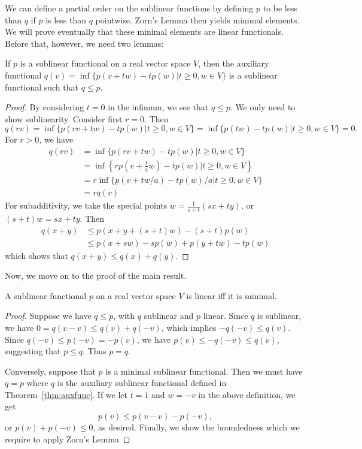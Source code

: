 \documentclass[prb,12pt]{revtex4-2}
\theoremstyle{definition}
\theoremstyle{definition}
\theoremstyle{definition}
\begin{document}
We can define a partial order on the sublinear functions by defining $p$ to be less than $q$ if $p$ is less than $q$ pointwise. Zorn's Lemma then yields minimal elements. We will prove eventually that these minimal elements are linear functionals. Before that, however, we need two lemmas:

\begin{Theorem}\label{thm:auxfunc}
	If $p$ is a sublinear functional on a real vector space $V$, then the auxiliary functional $q(v)=\inf \{p(v+tw)-tp(w)|t\ge 0,w\in V\} $ is a sublinear functional such that $q \le p$.
\end{Theorem}
\begin{proof}
	By considering $t=0$ in the infimum, we see that $q\le p$. We only need to show sublinearity. Consider first $r=0$. Then
	\[
	q(rv)=\inf \{p(rv+tw)-tp(w)|t\ge 0,w\in V\} =\inf \{p(tw)-tp(w)|t\ge 0, w\in V\} =0
	.\] 
	For $r>0$, we have
	\begin{align*}
		q(rv)&=\inf \{p(rv+tw)-tp(w)|t \ge 0, w\in V\} \\
		     &=\inf \left\{ rp\left( v+\frac{t}{a}w \right)-tp(w)|t\ge 0, w\in V \right\} \\
		     &=r\inf \{p(v+tw / a) -tp(w) / a|t\ge 0, w\in V\} \\
		     &=rq(v)
	\end{align*}
	For subadditivity, we take the special points $w=\frac{1}{s+t}(sx+ty)$, or $(s+t)w=sx+ty$. Then
	\begin{align*}
		q(x+y)&\le p(x+y+(s+t)w)-(s+t)p(w)\\
		      &\le p(x+sw)-sp(w)+p(y+tw)-tp(w)
	\end{align*}
	which shows that $q(x+y)\le q(x)+q(y)$.
\end{proof}
Now, we move on to the proof of the main result.
\begin{Theorem}
	A sublinear functional $p$ on a real vector space $V$ is linear iff it is minimal.
\end{Theorem}
\begin{proof}
	Suppose we have $q\le p$, with $q$ sublinear and $p$ linear. Since $q$ is sublinear, we have $0=q(v-v)\le q(v)+q(-v)$, which implies $-q(-v)\le q(v)$. Since $q(-v) \le p(-v)=-p(v)$, we have $p(v)\le -q(-v)\le q(v)$, suggesting that $p\le q$. Thus $p=q$.

	Conversely, suppose that $p$ is a minimal sublinear functional. Then we must have $q=p$ where $q$ is the auxiliary sublinear functional defined in Theorem~\ref{thm:auxfunc}. If we let $t=1$ and $w=-v$ in the above definition, we get
	\[
	p(v)\le p(v-v)-p(-v)
,\]
or $p(v)+p(-v)\le 0$, as desired. Finally, we show the boundedness which we require to apply Zorn's Lemma
\end{proof}
\end{document}
